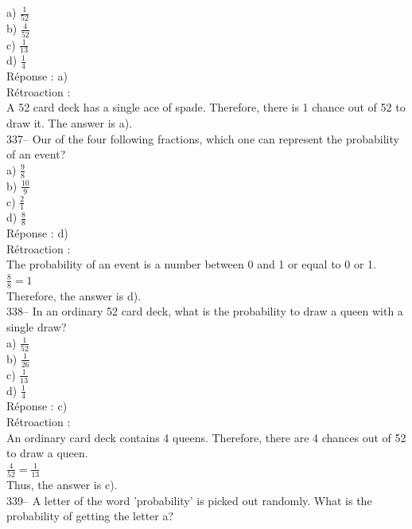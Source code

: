 \documentclass[letterpaper, 12pt]{article}
\begin{document}
a) $\frac{1}{52}$\\[2mm]
b) $\frac{4}{52}$\\[2mm]
c) $\frac{1}{13}$\\[2mm]
d) $\frac{1}{4}$\\

R\'eponse : a)\\

R\'etroaction : \\
A 52 card deck has a single ace of spade. Therefore, there is 1 chance out of 52 to draw it. The answer is a).\\

337-- Our of the four following fractions, which one can represent the probability of an event?\\

a) $\frac{9}{8}$\\[2mm]
b) $\frac{10}{9}$\\[2mm]
c) $\frac{2}{1}$\\[2mm]
d) $\frac{8}{8}$\\

R\'eponse : d)\\

R\'etroaction : \\
The probability of an event is a number between 0 and 1 or equal to 0 or 1.\\[2mm]
$\frac{8}{8}=1$\\[2mm]
Therefore, the answer is d).\\

338-- In an ordinary 52 card deck, what is the probability to draw a queen with a single draw?\\

a) $\frac{1}{52}$\\[2mm]
b) $\frac{1}{26}$\\[2mm]
c) $\frac{1}{13}$\\[2mm]
d) $\frac{1}{4}$\\

R\'eponse : c)\\

R\'etroaction : \\
An ordinary card deck contains 4 queens. Therefore, there are 4 chances out of 52 to draw a queen.\\[2mm]
$\frac{4}{52}=\frac{1}{13}$\\[2mm]
Thus, the answer is c).\\

339-- A letter of the word 'probability' is picked out randomly. What is the probability of getting the letter a?\\
\end{document}
